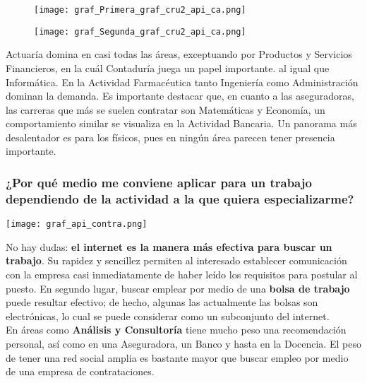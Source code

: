 \documentclass{article}
\begin{document}
\begin{figure}[h!]
\centering
\begin{minipage}{.5\textwidth}
  \centering
  \texttt{[image: graf\_Primera\_graf\_cru2\_api\_ca.png]}
\end{minipage}%
\begin{minipage}{.5\textwidth}
  \centering
  \texttt{[image: graf\_Segunda\_graf\_cru2\_api\_ca.png]}
\end{minipage}
\end{figure}

Actuaría domina en casi todas las áreas, exceptuando por Productos y Servicios Financieros, en la cuál Contaduría juega un papel importante. al igual que Informática. En la Actividad Farmacéutica tanto Ingeniería como Administración dominan la demanda. Es importante destacar que, en cuanto a las aseguradoras, las carreras que más se suelen contratar son Matemáticas y Economía, un comportamiento similar se visualiza en la Actividad Bancaria. Un panorama más desalentador es para los físicos, pues en ningún área parecen tener presencia importante. 



\subsubsection{¿Por qué medio me conviene aplicar para un trabajo dependiendo de la actividad a la que quiera especializarme?}

\begin{center}
    \texttt{[image: graf\_api\_contra.png]}
\end{center}

No hay dudas: \textbf{el internet es la manera más efectiva para buscar un trabajo}. Su rapidez y sencillez permiten al interesado establecer comunicación con la empresa casi inmediatamente de haber leído los requisitos para postular al puesto. En segundo lugar, buscar emplear por medio de una \textbf{bolsa de trabajo} puede resultar efectivo; de hecho, algunas las actualmente las bolsas son electrónicas, lo cual se puede considerar como un subconjunto del internet. \\

En áreas como \textbf{Análisis y Consultoría} tiene mucho peso una recomendación personal, así como en una Aseguradora, un Banco y hasta en la Docencia. El peso de tener una red social amplia es bastante mayor que buscar empleo por medio de una empresa de contrataciones. 
\end{document}
